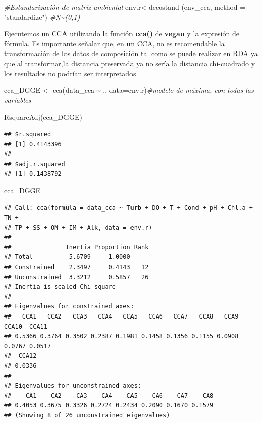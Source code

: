 \documentclass[
]{book}
\newenvironment{Shaded}{\begin{snugshade}}{\end{snugshade}}
\newcommand{\AttributeTok}[1]{\textcolor[rgb]{0.77,0.63,0.00}{#1}}
\newcommand{\CommentTok}[1]{\textcolor[rgb]{0.56,0.35,0.01}{\textit{#1}}}
\newcommand{\FunctionTok}[1]{\textcolor[rgb]{0.00,0.00,0.00}{#1}}
\newcommand{\NormalTok}[1]{#1}
\newcommand{\OtherTok}[1]{\textcolor[rgb]{0.56,0.35,0.01}{#1}}
\newcommand{\SpecialCharTok}[1]{\textcolor[rgb]{0.00,0.00,0.00}{#1}}
\newcommand{\StringTok}[1]{\textcolor[rgb]{0.31,0.60,0.02}{#1}}
\begin{document}
\begin{Shaded}
\begin{Highlighting}[]
\CommentTok{\#Estandarización de matriz ambiental}
\NormalTok{env.r}\OtherTok{\textless{}{-}}\FunctionTok{decostand}\NormalTok{ (env\_cca, }\AttributeTok{method =} \StringTok{"standardize"}\NormalTok{) }\CommentTok{\#N\textasciitilde{}(0,1)}
\end{Highlighting}
\end{Shaded}

Ejecutemos un CCA utilizando la función \textbf{cca()} de \textbf{vegan} y la expresión de fórmula. Es importante señalar que, en un CCA, no es recomendable la transformación de los datos de composición tal como se puede realizar en RDA ya que al transformar,la distancia preservada ya no sería la distancia chi-cuadrado y los resultados no podrían ser interpretados.

\begin{Shaded}
\begin{Highlighting}[]
\NormalTok{cca\_DGGE }\OtherTok{\textless{}{-}} \FunctionTok{cca}\NormalTok{(data\_cca }\SpecialCharTok{\textasciitilde{}}\NormalTok{ ., }\AttributeTok{data=}\NormalTok{env.r)}\CommentTok{\#modelo de máxima, con todas las variables}

\FunctionTok{RsquareAdj}\NormalTok{(cca\_DGGE) }
\end{Highlighting}
\end{Shaded}

\begin{verbatim}
## $r.squared
## [1] 0.4143396
## 
## $adj.r.squared
## [1] 0.1438792
\end{verbatim}

\begin{Shaded}
\begin{Highlighting}[]
\NormalTok{cca\_DGGE}
\end{Highlighting}
\end{Shaded}

\begin{verbatim}
## Call: cca(formula = data_cca ~ Turb + DO + T + Cond + pH + Chl.a + TN +
## TP + SS + OM + IM + Alk, data = env.r)
## 
##               Inertia Proportion Rank
## Total          5.6709     1.0000     
## Constrained    2.3497     0.4143   12
## Unconstrained  3.3212     0.5857   26
## Inertia is scaled Chi-square 
## 
## Eigenvalues for constrained axes:
##   CCA1   CCA2   CCA3   CCA4   CCA5   CCA6   CCA7   CCA8   CCA9  CCA10  CCA11 
## 0.5366 0.3764 0.3502 0.2387 0.1981 0.1458 0.1356 0.1155 0.0908 0.0767 0.0517 
##  CCA12 
## 0.0336 
## 
## Eigenvalues for unconstrained axes:
##    CA1    CA2    CA3    CA4    CA5    CA6    CA7    CA8 
## 0.4053 0.3675 0.3326 0.2724 0.2434 0.2090 0.1670 0.1579 
## (Showing 8 of 26 unconstrained eigenvalues)
\end{verbatim}
\end{document}

